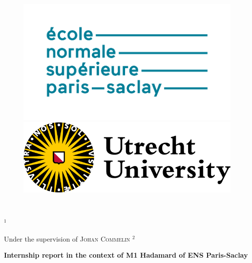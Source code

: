 \thispagestyle{plain}
\vspace*{\fill}
    \begin{center}
        \begin{figure}[!ht]
            \begin{minipage}{0.6\textwidth}
                \includegraphics[scale=0.20]{logo_ens_ps.png}
            \end{minipage}
            \begin{minipage}{0.4\textwidth}
                \includegraphics[scale=1]{logo_UU.png}
            \end{minipage}
        \end{figure}
    
        \makeatletter
        {\huge \textbf{\@title}}
        \\
        \medskip

    
        {\large \textsc{\@author} $^1$}
        \\
    
        \makeatother
    
        {
        \large Under the supervision of \textsc{Johan Commelin} $^2$\\}

    {\textbf{Internship report in the context of M1 Hadamard of ENS Paris-Saclay}}
  
    \end{center}



    \vspace*{\fill}

    \newpage
